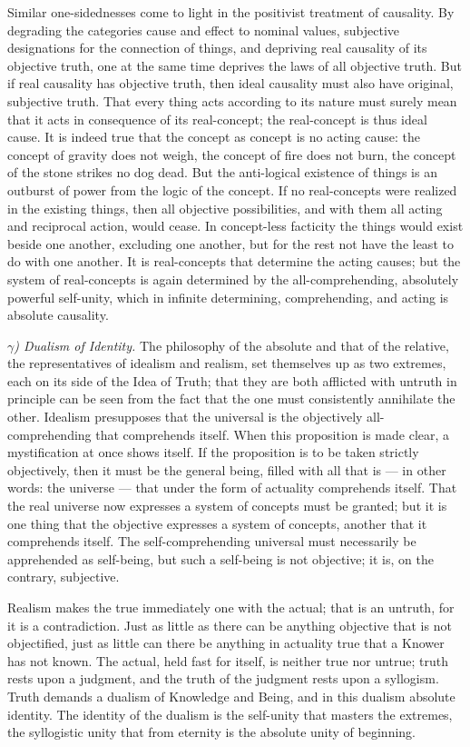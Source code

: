 \documentclass[12pt]{book}
\begin{document}
Similar one-sidednesses come to light in the positivist treatment of causality. By
degrading the categories cause and effect to nominal values, subjective
designations for the connection of things, and depriving real causality of its
objective truth, one at the same time deprives the laws of all objective truth.
But if real causality has objective truth, then ideal causality must also have
original, subjective truth. That every thing acts according to its nature must
surely mean that it acts in consequence of its real-concept; the real-concept is
thus ideal cause. It is indeed true that the concept as concept is no acting cause:
the concept of gravity does not weigh, the concept of fire does not burn, the
concept of the stone strikes no dog dead. But the anti-logical existence of things
is an outburst of power from the logic of the concept. If no real-concepts were
realized in the existing things, then all objective possibilities, and with them
all acting and reciprocal action, would cease. In concept-less facticity the
things would exist beside one another, excluding one another, but for the rest not
have the least to do with one another. It is real-concepts that determine the
acting causes; but the system of real-concepts is again determined by the
all-comprehending, absolutely powerful self-unity, which in infinite determining,
comprehending, and acting is absolute causality.

\emph{$\gamma$) Dualism of Identity.} The philosophy of the absolute and that of
the relative, the representatives of idealism and realism, set themselves up as two
extremes, each on its side of the Idea of Truth; that they are both afflicted with
untruth in principle can be seen from the fact that the one must consistently
annihilate the other. Idealism presupposes that the universal is the objectively
all-comprehending that comprehends itself. When this proposition is made clear, a
mystification at once shows itself. If the proposition is to be taken strictly
objectively, then it must be the general being, filled with all that is --- in
other words: the universe --- that under the form of actuality comprehends itself.
That the real universe now expresses a system of concepts must be granted; but it
is one thing that the objective expresses a system of concepts, another that it
comprehends itself. The self-comprehending universal must necessarily be
apprehended as self-being, but such a self-being is not objective; it is, on the
contrary, subjective.

Realism makes the true immediately one with the actual; that is an untruth, for it
is a contradiction. Just as little as there can be anything objective that is not
objectified, just as little can there be anything in actuality true that a Knower
has not known. The actual, held fast for itself, is neither true nor untrue; truth
rests upon a judgment, and the truth of the judgment rests upon a syllogism. Truth
demands a dualism of Knowledge and Being, and in this dualism absolute identity.
The identity of the dualism is the self-unity that masters the extremes, the
syllogistic unity that from eternity is the absolute unity of beginning.
\end{document}
